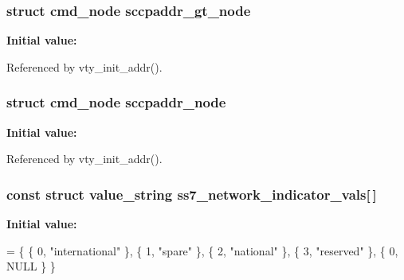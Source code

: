\subsubsection[{sccpaddr\+\_\+gt\+\_\+node}]{\setlength{\rightskip}{0pt plus 5cm}struct cmd\+\_\+node sccpaddr\+\_\+gt\+\_\+node\hspace{0.3cm}{\ttfamily [static]}}\label{osmo__ss7__vty_8c_a41a21a1fa9a591c99083b3c236c8ca5d}
{\bfseries Initial value\+:}


Referenced by vty\+\_\+init\+\_\+addr().

\subsubsection[{sccpaddr\+\_\+node}]{\setlength{\rightskip}{0pt plus 5cm}struct cmd\+\_\+node sccpaddr\+\_\+node\hspace{0.3cm}{\ttfamily [static]}}\label{osmo__ss7__vty_8c_a3a4bd522435455b44047beeec5e12f45}
{\bfseries Initial value\+:}


Referenced by vty\+\_\+init\+\_\+addr().

\subsubsection[{ss7\+\_\+network\+\_\+indicator\+\_\+vals}]{\setlength{\rightskip}{0pt plus 5cm}const struct value\+\_\+string ss7\+\_\+network\+\_\+indicator\+\_\+vals[$\,$]\hspace{0.3cm}{\ttfamily [static]}}\label{osmo__ss7__vty_8c_a551bc7617d3321692c8492461381d38a}
{\bfseries Initial value\+:}
\begin{DoxyCode}
= \{
        \{ 0,    \textcolor{stringliteral}{"international"} \},
        \{ 1,    \textcolor{stringliteral}{"spare"} \},
        \{ 2,    \textcolor{stringliteral}{"national"} \},
        \{ 3,    \textcolor{stringliteral}{"reserved"} \},
        \{ 0,    NULL \}
\}
\end{DoxyCode}


